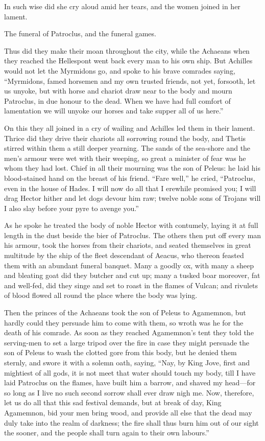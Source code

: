 In such wise did she cry aloud amid her tears, and the women joined in her
lament.


The funeral of Patroclus, and the funeral games.

Thus did they make their moan throughout the city, while the Achaeans when
they reached the Hellespont went back every man to his own ship. But
Achilles would not let the Myrmidons go, and spoke to his brave comrades
saying, “Myrmidons, famed horsemen and my own trusted friends, not yet,
forsooth, let us unyoke, but with horse and chariot draw near to the body
and mourn Patroclus, in due honour to the dead. When we have had full
comfort of lamentation we will unyoke our horses and take supper all of us
here.”

On this they all joined in a cry of wailing and Achilles led them in their
lament. Thrice did they drive their chariots all sorrowing round the body,
and Thetis stirred within them a still deeper yearning. The sands of the
sea-shore and the men’s armour were wet with their weeping, so great a
minister of fear was he whom they had lost. Chief in all their mourning
was the son of Peleus: he laid his blood-stained hand on the breast of his
friend. “Fare well,” he cried, “Patroclus, even in the house of Hades. I
will now do all that I erewhile promised you; I will drag Hector hither
and let dogs devour him raw; twelve noble sons of Trojans will I also slay
before your pyre to avenge you.”

As he spoke he treated the body of noble Hector with contumely, laying it
at full length in the dust beside the bier of Patroclus. The others then
put off every man his armour, took the horses from their chariots, and
seated themselves in great multitude by the ship of the fleet descendant
of Aeacus, who thereon feasted them with an abundant funeral banquet. Many
a goodly ox, with many a sheep and bleating goat did they butcher and cut
up; many a tusked boar moreover, fat and well-fed, did they singe and set
to roast in the flames of Vulcan; and rivulets of blood flowed all round
the place where the body was lying.

Then the princes of the Achaeans took the son of Peleus to Agamemnon, but
hardly could they persuade him to come with them, so wroth was he for the
death of his comrade. As soon as they reached Agamemnon’s tent they told
the serving-men to set a large tripod over the fire in case they might
persuade the son of Peleus to wash the clotted gore from this body, but he
denied them sternly, and swore it with a solemn oath, saying, “Nay, by
King Jove, first and mightiest of all gods, it is not meet that water
should touch my body, till I have laid Patroclus on the flames, have built
him a barrow, and shaved my head—for so long as I live no such
second sorrow shall ever draw nigh me. Now, therefore, let us do all that
this sad festival demands, but at break of day, King Agamemnon, bid your
men bring wood, and provide all else that the dead may duly take into the
realm of darkness; the fire shall thus burn him out of our sight the
sooner, and the people shall turn again to their own labours.”

